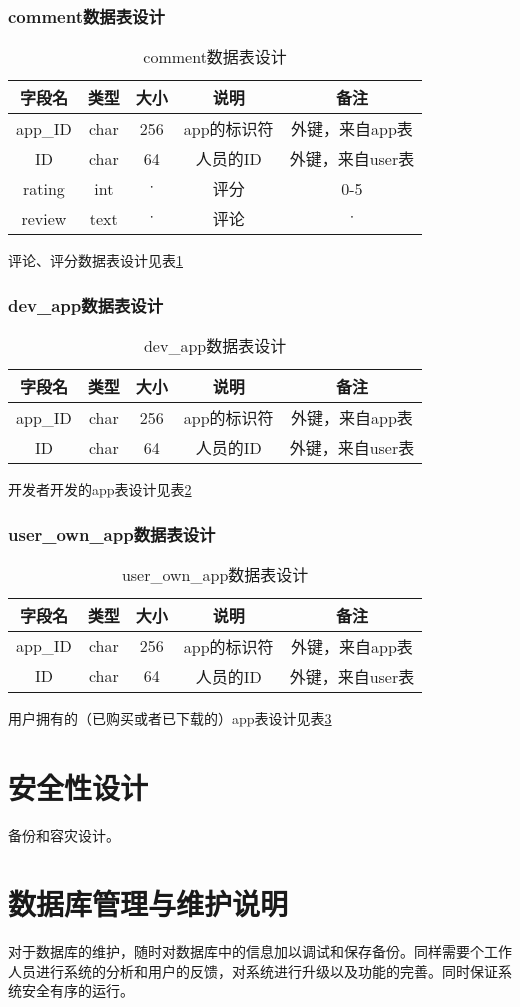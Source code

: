 \subsubsection{comment数据表设计}
\begin{table}[htbp]
\centering
\caption{comment数据表设计} \label{tab:comment_database}
\begin{tabular}{|c|c|c|c|c|}
    \hline
    字段名 & 类型 & 大小 & 说明 & 备注 \\
    \hline
    app\_ID & char & 256 & app的标识符 & 外键，来自app表\\
    \hline
    ID & char & 64 & 人员的ID & 外键，来自user表 \\
    \hline 
    rating & int & $\cdot$ & 评分& 0-5 \\
    \hline
    review & text & $\cdot$ & 评论 & $\cdot$ \\
    \hline
\end{tabular}
\end{table}
评论、评分数据表设计见表\ref{tab:comment_database}


\subsubsection{dev\_app数据表设计}
\begin{table}[htbp]
\centering
\caption{dev\_app数据表设计} \label{tab:dev_app_database}
\begin{tabular}{|c|c|c|c|c|}
    \hline
    字段名 & 类型 & 大小 & 说明 & 备注 \\
    \hline
    app\_ID & char & 256 & app的标识符 & 外键，来自app表\\
    \hline
    ID & char & 64 & 人员的ID & 外键，来自user表 \\
    \hline 
\end{tabular}
\end{table}
开发者开发的app表设计见表\ref{tab:dev_app_database}

\subsubsection{user\_own\_app数据表设计}
\begin{table}[htbp]
\centering
\caption{user\_own\_app数据表设计} \label{tab:user_own_app_database}
\begin{tabular}{|c|c|c|c|c|}
    \hline
    字段名 & 类型 & 大小 & 说明 & 备注 \\
    \hline
    app\_ID & char & 256 & app的标识符 & 外键，来自app表\\
    \hline
    ID & char & 64 & 人员的ID & 外键，来自user表 \\
    \hline 
\end{tabular}
\end{table}
用户拥有的（已购买或者已下载的）app表设计见表\ref{tab:user_own_app_database}

\section{安全性设计}
备份和容灾设计。

\section{数据库管理与维护说明}
对于数据库的维护，随时对数据库中的信息加以调试和保存备份。同样需要个工作人员进行系统的分析和用户的反馈，对系统进行升级以及功能的完善。同时保证系统安全有序的运行。